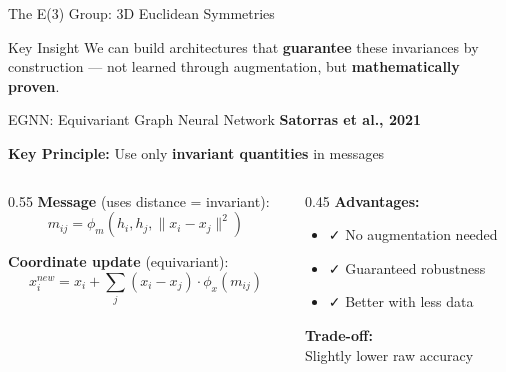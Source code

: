 \documentclass[aspectratio=169]{beamer}
\begin{document}
\begin{frame}{The E(3) Group: 3D Euclidean Symmetries}
    \vspace{1em}
    \begin{alertblock}{Key Insight}
        We can build architectures that \textbf{guarantee} these invariances by construction — not learned through augmentation, but \textbf{mathematically proven}.
    \end{alertblock}
\end{frame}

\begin{frame}{EGNN: Equivariant Graph Neural Network}
    \textbf{Satorras et al., 2021}
    
    \vspace{0.5em}
    \textbf{Key Principle:} Use only \textbf{invariant quantities} in messages
    
    \begin{columns}
        \begin{column}{0.55\textwidth}
            \textbf{Message} (uses distance = invariant):
    \begin{equation*}
        m_{ij} = \phi_m\left(h_i, h_j, \|x_i - x_j\|^2\right)
    \end{equation*}
    
    \textbf{Coordinate update} (equivariant):
    \begin{equation*}
                x_i^{new} = x_i + \sum_{j} (x_i - x_j) \cdot \phi_x(m_{ij})
    \end{equation*}
        \end{column}
        \begin{column}{0.45\textwidth}
            \textbf{Advantages:}
            \begin{itemize}
                \item \textcolor{cysticGreen}{\faCheck} No augmentation needed
                \item \textcolor{cysticGreen}{\faCheck} Guaranteed robustness
                \item \textcolor{cysticGreen}{\faCheck} Better with less data
            \end{itemize}
    
            \vspace{0.3em}
            \textbf{Trade-off:}\\
            Slightly lower raw accuracy
        \end{column}
    \end{columns}
\end{frame}
\end{document}
